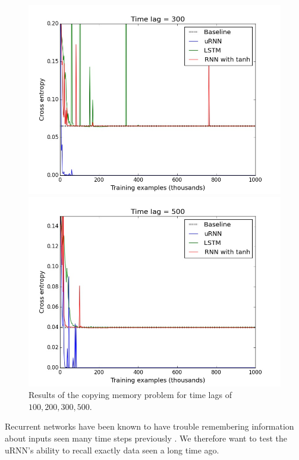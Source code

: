\documentclass{article} %
\begin{document}
\begin{figure}[t!]
\begin{minipage}[b]{0.5\linewidth}
    \includegraphics[scale=0.25]{figures/memory_300.jpeg}
  \end{minipage}%
  \begin{minipage}[b]{0.5\linewidth}
    \includegraphics[scale=0.25]{figures/memory_500.jpeg}
  \end{minipage} 
  \caption{Results of the copying memory problem for time lags of $100, 200, 300, 500$.}
\end{figure}

Recurrent networks have been known to have trouble remembering information about inputs seen
many time steps previously \citep{Yoshua94, Pascanu2013}. 
We therefore want to test the uRNN's ability to recall exactly data seen a long time ago.
\end{document}
